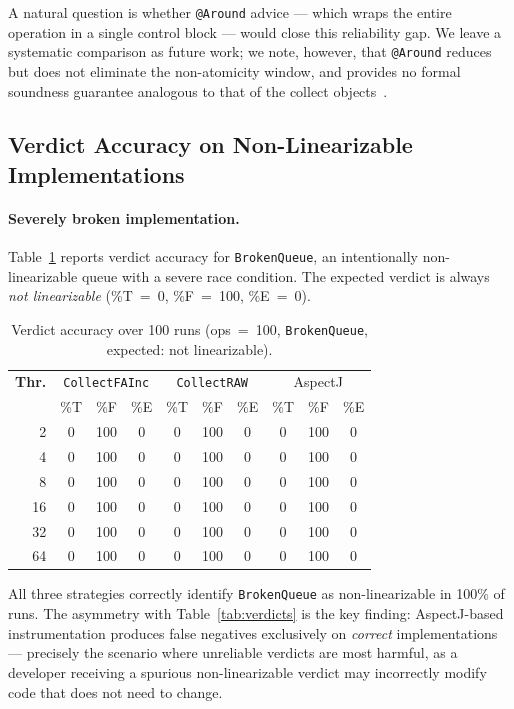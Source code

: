\documentclass[preprint,12pt]{elsarticle}
\begin{document}
A natural question is whether \texttt{@Around} advice --- which wraps
the entire operation in a single control block --- would close this
reliability gap. We leave a systematic comparison as future work; we
note, however, that \texttt{@Around} reduces but does not eliminate
the non-atomicity window, and provides no formal soundness guarantee
analogous to that of the collect objects~\cite{RC24}.

\subsection{Verdict Accuracy on Non-Linearizable Implementations}

\paragraph{Severely broken implementation.}
Table~\ref{tab:verdicts-broken} reports verdict accuracy for
\texttt{BrokenQueue}, an intentionally non-linearizable queue with a
severe race condition. The expected verdict is always \emph{not
linearizable} (\%T~=~0, \%F~=~100, \%E~=~0).

\begin{table}[h!]
\centering
\scriptsize
\caption{Verdict accuracy over 100 runs (ops~=~100, \texttt{BrokenQueue},
         expected: not linearizable).}
\label{tab:verdicts-broken}
\begin{tabular}{rccccccccc}
\hline
\textbf{Thr.}
  & \multicolumn{3}{c}{\texttt{CollectFAInc}}
  & \multicolumn{3}{c}{\texttt{CollectRAW}}
  & \multicolumn{3}{c}{AspectJ} \\
  & \%T & \%F & \%E & \%T & \%F & \%E & \%T & \%F & \%E \\
\hline
 2 & 0 & 100 & 0 & 0 & 100 & 0 & 0 & 100 & 0 \\
 4 & 0 & 100 & 0 & 0 & 100 & 0 & 0 & 100 & 0 \\
 8 & 0 & 100 & 0 & 0 & 100 & 0 & 0 & 100 & 0 \\
16 & 0 & 100 & 0 & 0 & 100 & 0 & 0 & 100 & 0 \\
32 & 0 & 100 & 0 & 0 & 100 & 0 & 0 & 100 & 0 \\
64 & 0 & 100 & 0 & 0 & 100 & 0 & 0 & 100 & 0 \\
\hline
\end{tabular}
\end{table}

All three strategies correctly identify \texttt{BrokenQueue} as
non-linearizable in 100\% of runs. The asymmetry with
Table~\ref{tab:verdicts} is the key finding: AspectJ-based
instrumentation produces false negatives exclusively on \emph{correct}
implementations --- precisely the scenario where unreliable verdicts
are most harmful, as a developer receiving a spurious non-linearizable
verdict may incorrectly modify code that does not need to change.
\end{document}
